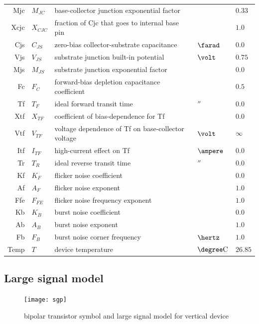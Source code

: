 \documentclass[10pt]{report}
\begin{document}
\begin{tabular}{rllll}
Mjc & $M_{JC}$ & base-collector junction exponential factor & & $0.33$\\
Xcjc & $X_{CJC}$ & fraction of Cjc that goes to internal base pin & & $1.0$\\
Cjs & $C_{JS}$ & zero-bias collector-substrate capacitance & $\farad$ & $0.0$\\
Vjs & $V_{JS}$ & substrate junction built-in potential & $\volt$ & $0.75$\\
Mjs & $M_{JS}$ & substrate junction exponential factor & & $0.0$\\
Fc & $F_C$ & forward-bias depletion capacitance coefficient & & $0.5$\\
Tf & $T_F$ & ideal forward transit time & $\second$ & $0.0$\\
Xtf & $X_{TF}$ & coefficient of bias-dependence for Tf & & $0.0$\\
Vtf & $V_{TF}$ & voltage dependence of Tf on base-collector voltage & $\volt$ & $\infty$\\
Itf & $I_{TF}$ & high-current effect on Tf & $\ampere$ & $0.0$\\
Tr & $T_R$ & ideal reverse transit time & $\second$ & $0.0$\\
Kf & $K_F$ & flicker noise coefficient & & $0.0$\\
Af & $A_F$ & flicker noise exponent & & $1.0$\\
Ffe & $F_{FE}$ & flicker noise frequency exponent & & $1.0$\\
Kb & $K_B$ & burst noise coefficient & & $0.0$\\
Ab & $A_B$ & burst noise exponent & & $1.0$\\
Fb & $F_B$ & burst noise corner frequency & $\hertz$ & $1.0$\\
Temp & $T$ & device temperature & $\degree \mathrm{C}$ & $26.85$
\end{tabular}

\subsection{Large signal model}

\begin{figure}[ht]
\begin{center}
\texttt{[image: sgp]}
\end{center}
\caption{bipolar transistor symbol and large signal model for vertical device}
\label{fig:bjt}
\end{figure}
\FloatBarrier
\end{document}
